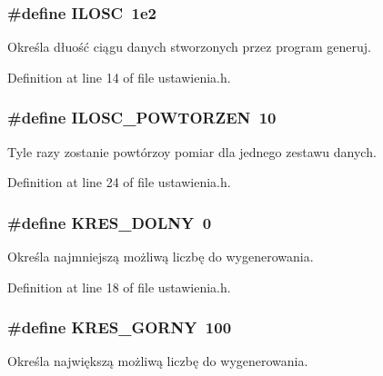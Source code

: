 \subsubsection[{I\-L\-O\-S\-C}]{\setlength{\rightskip}{0pt plus 5cm}\#define I\-L\-O\-S\-C~1e2}\label{ustawienia_8h_a400f3b16594461b02b7a73ad07b24c0e}
Określa dłuość ciągu danych stworzonych przez program generuj. 

Definition at line 14 of file ustawienia.\-h.

\subsubsection[{I\-L\-O\-S\-C\-\_\-\-P\-O\-W\-T\-O\-R\-Z\-E\-N}]{\setlength{\rightskip}{0pt plus 5cm}\#define I\-L\-O\-S\-C\-\_\-\-P\-O\-W\-T\-O\-R\-Z\-E\-N~10}\label{ustawienia_8h_a923942350ba378e49a53193355cb5ec0}
Tyle razy zostanie powtórzoy pomiar dla jednego zestawu danych. 

Definition at line 24 of file ustawienia.\-h.

\subsubsection[{K\-R\-E\-S\-\_\-\-D\-O\-L\-N\-Y}]{\setlength{\rightskip}{0pt plus 5cm}\#define K\-R\-E\-S\-\_\-\-D\-O\-L\-N\-Y~0}\label{ustawienia_8h_a6b2bdad24a7530210341c1c3a0197dd9}
Określa najmniejszą możliwą liczbę do wygenerowania. 

Definition at line 18 of file ustawienia.\-h.

\subsubsection[{K\-R\-E\-S\-\_\-\-G\-O\-R\-N\-Y}]{\setlength{\rightskip}{0pt plus 5cm}\#define K\-R\-E\-S\-\_\-\-G\-O\-R\-N\-Y~100}\label{ustawienia_8h_a2e9c0e30a722750fa4380b8150337c6f}
Określa największą możliwą liczbę do wygenerowania. 


